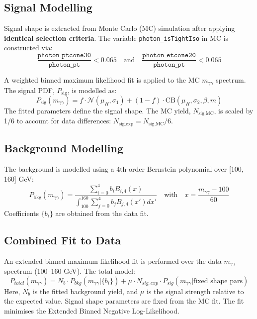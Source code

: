 \documentclass[11pt]{article}
\begin{document}
\subsection*{Signal Modelling}

Signal shape is extracted from Monte Carlo (MC) simulation after applying \textbf{identical selection criteria}. The variable \texttt{photon\_isTightIso} in MC is constructed via:
\[
\frac{\texttt{photon\_ptcone30}}{\texttt{photon\_pt}} < 0.065 \quad \text{and} \quad \frac{\texttt{photon\_etcone20}}{\texttt{photon\_pt}} < 0.065
\]

A weighted binned maximum likelihood fit is applied to the MC \( m_{\gamma\gamma} \) spectrum. The signal PDF, \( P_{\text{sig}} \), is modelled as:
\[
P_{\text{sig}}(m_{\gamma\gamma}) = f \cdot \mathcal{N}(\mu_H, \sigma_1) + (1 - f) \cdot \text{CB}(\mu_H, \sigma_2, \beta, m)
\]
The fitted parameters define the signal shape. The MC yield, \( N_{\text{sig,MC}} \), is scaled by 1/6 to account for data differences: \( N_{\text{sig,exp}} = N_{\text{sig,MC}} / 6 \).

\subsection*{Background Modelling}

The background is modelled using a 4th-order Bernstein polynomial over [100, 160] GeV:
\[
P_{\text{bkg}}(m_{\gamma\gamma}) = \frac{\sum_{i=0}^{4} b_i B_{i,4}(x)}{\int_{100}^{160} \sum_{j=0}^{4} b_j B_{j,4}(x') dx'} \quad \text{with} \quad x = \frac{m_{\gamma\gamma} - 100}{60}
\]
Coefficients \( \{b_i\} \) are obtained from the data fit.

\subsection*{Combined Fit to Data}

An extended binned maximum likelihood fit is performed over the data \( m_{\gamma\gamma} \) spectrum (100–160 GeV). The total model:
\[ 
P_{total}(m_{\gamma\gamma}) = N_b \cdot P_{bkg}(m_{\gamma\gamma} | \{b_i\}) + \mu \cdot N_{sig,exp} \cdot P_{sig}(m_{\gamma\gamma} | \text{fixed shape pars}) 
\]
Here, \( N_b \) is the fitted background yield, and \( \mu \) is the signal strength relative to the expected value. Signal shape parameters are fixed from the MC fit. The fit minimises the Extended Binned Negative Log-Likelihood.
\end{document}
